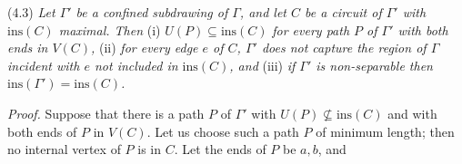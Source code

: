 \stmt
(4.3) \textit{Let $\Gamma'$ be a confined subdrawing of $\Gamma$, and let $C$ be a circuit of $\Gamma'$ with $\text{ins}(C)$ maximal. Then} (i) $U(P) \subseteq \text{ins}(C)$ \textit{for every path $P$ of $\Gamma'$ with both ends in $V(C)$,} (ii) \textit{for every edge $e$ of $C$, $\Gamma'$ does not capture the region of $\Gamma$ incident with $e$ not included in $\text{ins}(C)$, and} (iii) \textit{if $\Gamma'$ is non-separable then $\text{ins}(\Gamma') = \text{ins}(C)$.}

\textit{Proof.} Suppose that there is a path $P$ of $\Gamma'$ with $U(P) \not\subseteq \text{ins}(C)$ and with both ends of $P$ in $V(C)$. Let us choose such a path $P$ of minimum length; then no internal vertex of $P$ is in $C$. Let the ends of $P$ be $a, b$, and
